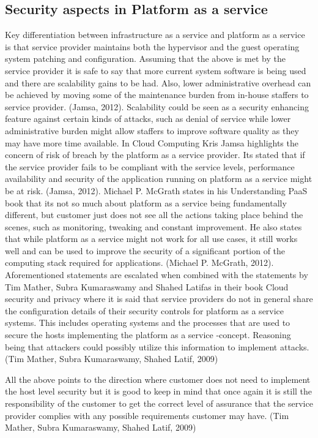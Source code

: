 \documentclass{article}
\begin{document}
\subsection{Security aspects in Platform as a service}
Key differentiation between infrastructure as a service and platform as a service is that service provider maintains both the hypervisor and the guest operating system patching and configuration.
Assuming that the above is met by the service provider it is safe to say that more current system software is being used and there are scalability gains to be had. Also, lower administrative overhead can be achieved by moving some of the maintenance burden from in-house staffers to service provider. (Jamsa, 2012). Scalability could be seen as a security enhancing feature against certain kinds of attacks, such as denial of service while lower administrative burden might allow staffers to improve software quality as they may have more time available.
In Cloud Computing Kris Jamsa highlights the concern of risk of breach by the platform as a service provider. Its stated that if the service provider fails to be compliant with the service levels, performance availability and security of the application running on platform as a service might be at risk. (Jamsa, 2012).
Michael P. McGrath states in his Understanding PaaS book that its not so much about platform as a service being fundamentally different, but customer just does not see all the actions taking place behind the scenes, such as monitoring, tweaking and constant improvement. He also states that while platform as a service might not work for all use cases, it still works well and can be used to improve the security of a significant portion of the computing stack required for applications. (Michael P. McGrath, 2012).
Aforementioned statements are escalated when combined with the statements by Tim Mather, Subra Kumaraswamy and Shahed Latifas in their book Cloud security and privacy where it is said that service providers do not in general share the configuration details of their security controls for platform as a service systems. This includes operating systems and the processes that are used to secure the hosts implementing the platform as a service -concept. Reasoning being that attackers could possibly utilize this information to implement attacks. (Tim Mather, Subra Kumaraswamy, Shahed Latif, 2009)
\par
All the above points to the direction where customer does not need to implement the host level security but it is good to keep in mind that once again it is still the responsibility of the customer to get the correct level of assurance that the service provider complies with any possible requirements customer may have. (Tim Mather, Subra Kumaraswamy, Shahed Latif, 2009)
\end{document}
